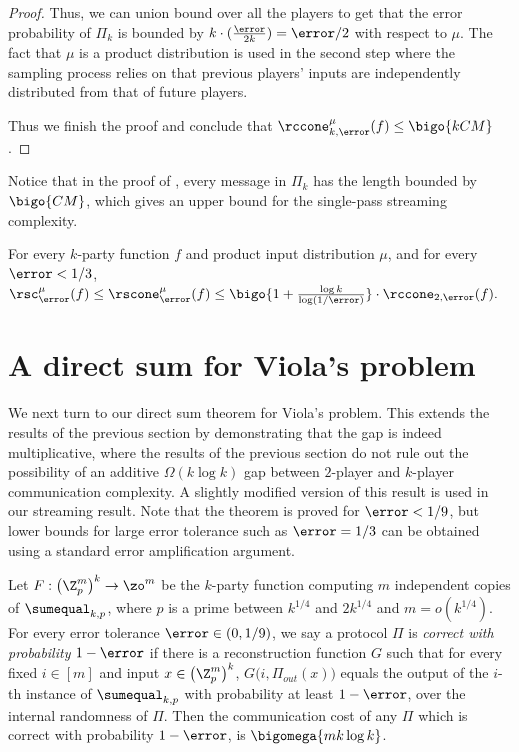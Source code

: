 \begin{proof}
Thus, we can union bound over all the players to get that the error probability of $\Pi_k$ is bounded by $k\cdot (\frac{\error}{2k})=\error/2$ with respect to $\mu$.
The fact that $\mu$ is a product distribution is used in the second step where the sampling process relies on that previous players' inputs are independently distributed from that of future players.

Thus we finish the proof and conclude that 
$\rccone_{k,\error}^{\mu}(f)\le \bigo{kCM}$.
\end{proof}


Notice that in the proof of , every message in $\Pi_k$ has the length bounded by $\bigo{CM}$, which gives an upper bound for the single-pass streaming complexity.

\begin{corollary}\label{corollary:separation upper bound}
For every $k$-party function $f$ and product input distribution $\mu$, and for every $\error < 1/3$, 
$\rsc_{\error}^{\mu}(f) \le\rscone_{\error}^{\mu}(f) \le  \bigo{1+\frac{\log k}{\log(1/\error)}} \cdot \rccone_{2,\error}(f).$
\end{corollary}

\section{A direct sum for Viola's problem}
We next turn to our direct sum theorem for Viola's problem. {\color{black}This extends the results of the previous section by demonstrating that the gap is indeed multiplicative, where the results of the previous section do not rule out the possibility of an additive $\Omega(k \log k)$ gap between $2$-player and $k$-player communication complexity. A slightly modified version of this result is used in our streaming result.}
Note that the theorem is proved for $\error < 1/9$, but lower bounds for large error tolerance such as $\error=1/3$ can be obtained using a standard error amplification argument.

	\begin{theorem}\label{thm:A1}
		Let $F:\left(\Z_p^m\right)^k \to \zo^m$ be the $k$-party function computing $m$ independent copies of $\sumequal_{k,p}$, where $p$ is a prime between $k^{1/4}$ and $2k^{1/4}$ {\color{black}and $m = o(k^{1/4})$.}
		For every error tolerance $\error\in(0,1/9)$,  
        we say a protocol $\Pi$ is \emph{correct with probability $1-\error$}
		if there is a reconstruction
		function $G$ such that for every fixed $i \in [m]$ and input $x\in \left(\Z_p^m\right)^k$, $G\big(i, \Pi_{out}(x)\big)$ equals the
		output of the $i$-th instance of $\sumequal_{k,p}$ with probability at least
		$1-\error$, over the internal randomness of $\Pi$. 
		Then the communication cost of any $\Pi$ which is correct with probability $1-\error$, is $\bigomega{m k\log k}$.
	\end{theorem}

